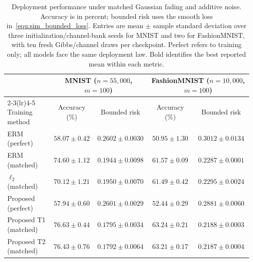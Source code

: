 \begin{table}[t]
\centering\footnotesize
\caption{Deployment performance under matched Gaussian fading and additive noise. Accuracy is in percent; bounded risk uses the smooth loss in~\eqref{equ:sim_bounded_loss}. Entries are mean $\pm$ sample standard deviation over three initialization/channel-bank seeds for MNIST and two for FashionMNIST, with ten fresh Gibbs/channel draws per checkpoint. Perfect refers to training only; all models face the same deployment law. Bold identifies the best reported mean within each metric.}
\label{tab:sim_accuracy_risk}
\setlength{\tabcolsep}{5pt}
\begin{tabular}{lcccc}
\toprule
& \multicolumn{2}{c}{MNIST ($n=55{,}000$, $m=100$)} & \multicolumn{2}{c}{FashionMNIST ($n=10{,}000$, $m=100$)}\\
\cmidrule(lr){2-3}\cmidrule(lr){4-5}
Training method & Accuracy (\%) & Bounded risk & Accuracy (\%) & Bounded risk\\
\midrule
ERM (perfect) & $58.07\pm0.42$ & $0.2602\pm0.0030$ & $50.95\pm1.30$ & $0.3012\pm0.0134$\\
ERM (matched) & $74.60\pm1.12$ & $0.1944\pm0.0098$ & $61.57\pm0.09$ & $0.2287\pm0.0001$\\
$\ell_2$ (matched) & $70.12\pm1.21$ & $0.1950\pm0.0070$ & $61.49\pm0.42$ & $0.2295\pm0.0024$\\
Proposed (perfect) & $57.94\pm0.60$ & $0.2601\pm0.0029$ & $52.44\pm0.29$ & $0.2881\pm0.0060$\\
Proposed T1 (matched) & $\mathbf{76.63\pm0.44}$ & $0.1795\pm0.0034$ & $\mathbf{63.24\pm0.21}$ & $0.2188\pm0.0003$\\
Proposed T2 (matched) & $76.43\pm0.76$ & $\mathbf{0.1792\pm0.0064}$ & $63.21\pm0.17$ & $\mathbf{0.2187\pm0.0004}$\\
\bottomrule
\end{tabular}
\end{table}
